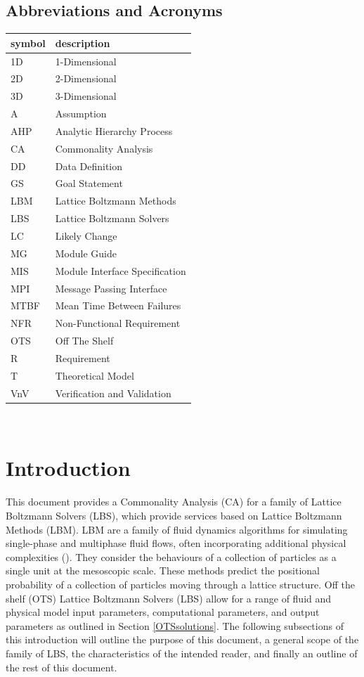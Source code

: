 \documentclass[12pt]{article}
\begin{document}
\subsection{Abbreviations and Acronyms}

\renewcommand{\arraystretch}{1.2}
\begin{tabular}{l l} 
  \toprule		
  \textbf{symbol} & \textbf{description}\\
  \midrule
  1D & 1-Dimensional\\ 
  2D & 2-Dimensional\\ 
  3D & 3-Dimensional\\ 
  A & Assumption\\
  AHP & Analytic Hierarchy Process\\
  CA & Commonality Analysis\\
  DD & Data Definition\\
  GS & Goal Statement\\
  LBM & Lattice Boltzmann Methods\\
  LBS & Lattice Boltzmann Solvers\\
  LC & Likely Change\\
  MG & Module Guide\\
  MIS & Module Interface Specification\\
  MPI & Message Passing Interface\\
  MTBF & Mean Time Between Failures\\
  NFR & Non-Functional Requirement\\
  OTS & Off The Shelf\\
  R & Requirement\\
  T & Theoretical Model\\
  VnV & Verification and Validation\\
  \bottomrule
\end{tabular}\\

\newpage

\tableofcontents

\newpage
\section{Introduction}

This document provides a Commonality Analysis (CA) for a family of Lattice Boltzmann Solvers (LBS), which provide services based on Lattice Boltzmann Methods (LBM).
LBM are a family of fluid dynamics algorithms for simulating single-phase and multiphase fluid flows, often incorporating additional physical complexities (\citet{chen1998lattice}). They consider the behaviours of a collection of particles as a single unit at the mesoscopic scale. These methods predict the positional probability of a collection of particles moving through a lattice structure. Off the shelf (OTS) Lattice Boltzmann Solvers (LBS) allow for a range of fluid and physical model input parameters, computational parameters, and output parameters as outlined in Section \ref{OTSsolutions}.
The following subsections of this introduction will outline the purpose of this document, a general scope of the family of LBS, the characteristics of the intended reader, and finally an outline of the rest of this document.
\end{document}
